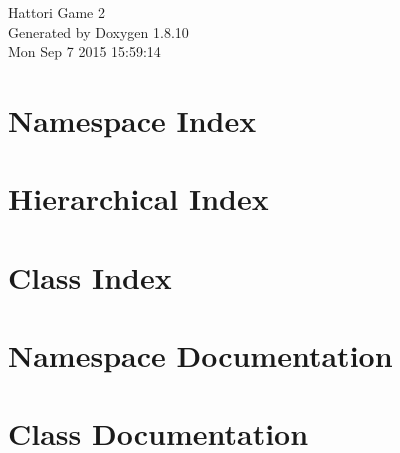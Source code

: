 \documentclass[twoside]{book}
\newcommand{\+}{\discretionary{\mbox{\scriptsize$\hookleftarrow$}}{}{}}
\newcommand{\clearemptydoublepage}{%
  \newpage{\pagestyle{empty}\cleardoublepage}%
}
\begin{document}
\hypersetup{pageanchor=false,
             bookmarks=true,
             bookmarksnumbered=true,
             pdfencoding=unicode
            }
\begin{titlepage}
\vspace*{7cm}
\begin{center}%
{\Large Hattori Game 2 }\\
\vspace*{1cm}
{\large Generated by Doxygen 1.8.10}\\
\vspace*{0.5cm}
{\small Mon Sep 7 2015 15:59:14}\\
\end{center}
\end{titlepage}
\clearemptydoublepage
\tableofcontents
\clearemptydoublepage
{}
\hypersetup{pageanchor=true}

\chapter{Namespace Index}

\chapter{Hierarchical Index}

\chapter{Class Index}

\chapter{Namespace Documentation}




\chapter{Class Documentation}














\backmatter
\newpage
{}
\clearemptydoublepage
{}
\printindex
\end{document}
